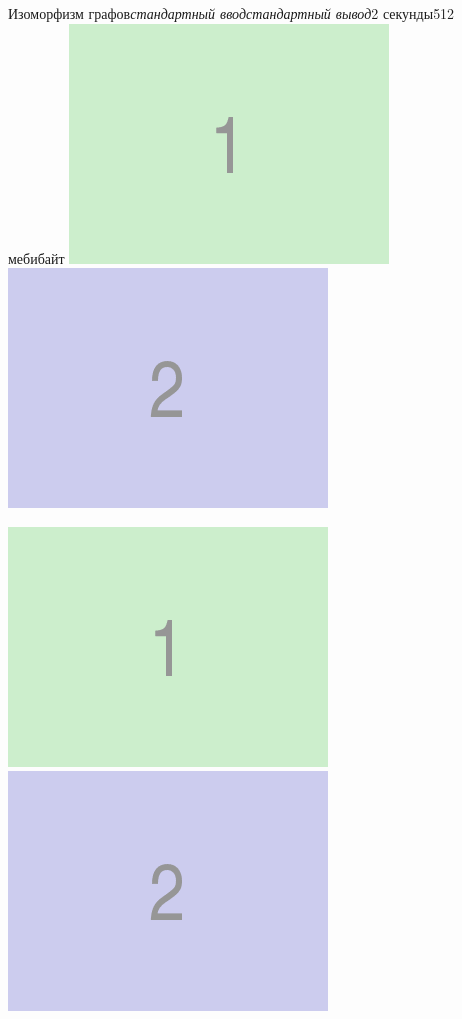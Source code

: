 \begin{problem}{Изоморфизм графов}{\textsl{стандартный ввод}}{\textsl{стандартный вывод}}{2 секунды}{512 мебибайт}{}
\includegraphics{static/fig1.png}
\includegraphics{static/fig2.png}


\Example

\begin{example}%
%
\end{example}
\includegraphics{static/fig1.png}%
\includegraphics{static/fig2.png}

\end{problem}
